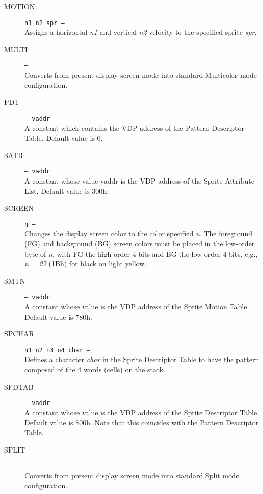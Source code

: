 \documentclass{article}
\begin{document}
\begin{multicols}{2}[]
\begin{description}
			\item[MOTION]\texttt{n1 n2 spr --- }\\
				Assigns a horizontal \textit{n1} and vertical \textit{n2} velocity
				to the specified sprite \textit{spr}.

			\item[MULTI]\texttt{--- }\\
				Converts from present display screen mode into standard Multicolor
				mode configuration.

			\item[PDT]\texttt{--- vaddr }\\
				A constant which contains the VDP address of the Pattern Descriptor
				Table. Default value is 0.

			\item[SATR]\texttt{--- vaddr }\\
				A constant whose value vaddr is the VDP address of the Sprite
				Attribute List. Default value is 300h.

			\item[SCREEN]\texttt{n --- }\\
				Changes the display screen color to the color specified \textit{n}.
				The foreground (FG) and background (BG) screen colors must be placed
				in the low-order byte of \textit{n}, with FG the high-order 4 bits
				and BG the low-order 4 bits, e.g., \textit{n = 27} (1Bh) for black
				on light yellow.

			\item[SMTN]\texttt{--- vaddr }\\
				A constant whose value is the VDP address of the Sprite Motion
				Table. Default value is 780h.

			\item[SPCHAR]\texttt{n1 n2 n3 n4 char --- }\\
				Defines a character \textit{char} in the Sprite Descriptor Table to
				have the pattern composed of the 4 words (cells) on the stack.

			\item[SPDTAB]\texttt{--- vaddr }\\
				A constant whose value is the VDP address of the Sprite Descriptor
				Table. Default value is 800h. Note that this coincides with the
				Pattern Descriptor Table.

			\item[SPLIT]\texttt{--- }\\
				Converts from present display screen mode into standard Split mode
				configuration.


\end{description}
\end{multicols}
\end{document}
